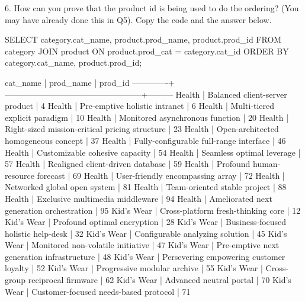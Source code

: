 6. How can you prove that the product id is being used to do the ordering? (You may have already done this in Q5). Copy the code and the answer below.
\begin{sql}
SELECT category.cat_name, product.prod_name, product.prod_id FROM category
JOIN product ON product.prod_cat = category.cat_id
ORDER BY category.cat_name, product.prod_id;
\end{sql}
\begin{pseudo*}
  cat_name   |                    prod_name                     | prod_id 
-------------+--------------------------------------------------+---------
 Health      | Balanced client-server product                   |       4
 Health      | Pre-emptive holistic intranet                    |       6
 Health      | Multi-tiered explicit paradigm                   |      10
 Health      | Monitored asynchronous function                  |      20
 Health      | Right-sized mission-critical pricing structure   |      23
 Health      | Open-architected homogeneous concept             |      37
 Health      | Fully-configurable full-range interface          |      46
 Health      | Customizable cohesive capacity                   |      54
 Health      | Seamless optimal leverage                        |      57
 Health      | Realigned client-driven database                 |      59
 Health      | Profound human-resource forecast                 |      69
 Health      | User-friendly encompassing array                 |      72
 Health      | Networked global open system                     |      81
 Health      | Team-oriented stable project                     |      88
 Health      | Exclusive multimedia middleware                  |      94
 Health      | Ameliorated next generation orchestration        |      95
 Kid's Wear  | Cross-platform fresh-thinking core               |      12
 Kid's Wear  | Profound optimal encryption                      |      28
 Kid's Wear  | Business-focused holistic help-desk              |      32
 Kid's Wear  | Configurable analyzing solution                  |      45
 Kid's Wear  | Monitored non-volatile initiative                |      47
 Kid's Wear  | Pre-emptive next generation infrastructure       |      48
 Kid's Wear  | Persevering empowering customer loyalty          |      52
 Kid's Wear  | Progressive modular archive                      |      55
 Kid's Wear  | Cross-group reciprocal firmware                  |      62
 Kid's Wear  | Advanced neutral portal                          |      70
 Kid's Wear  | Customer-focused needs-based protocol            |      71

\end{pseudo*}
